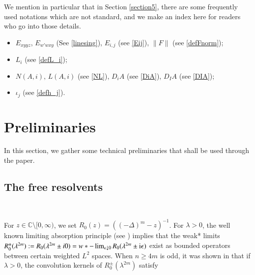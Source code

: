 \documentclass[11pt,reqno]{amsart}
\def\i{{\rm i}}
\numberwithin{equation}{section}
\theoremstyle{definition}
\begin{document}
We mention in particular that in Section \ref{section5}, there are some frequently used notations which are not standard, and we make an index here for readers who go into those details.
\begin{itemize}
	\item  $E_{xyyz}$, $E_{w'wxy}$ (See \eqref{linesing}),  $E_{i,j}$ (see \eqref{Eij}), $\|F\|$ (see \eqref{defFnorm});\vspace{10pt}
	
	\item  $L_i$ (see \eqref{defL_i});\vspace{10pt}
	
	\item $N(A,i),\,L(A,i)$ (see \eqref{NL}), $D_iA$ (see \eqref{DiA}), $D_IA$ (see \eqref{DIA});\vspace{10pt}
	
	\item $\iota_j$ (see \eqref{defh_j}).
	
	
	
\end{itemize}




\section{Preliminaries}\label{section2}
In this section, we gather some technical preliminaries that shall be used through the paper.

\subsection{The free resolvents}\label{section2.1}\

For $z\in \mathbb{C}\setminus[0,\infty)$, we set $R_0(z)=((-\Delta)^m-z)^{-1}$. For $\lambda>0$, the well known limiting absorption principle (see \cite{AH}) implies that the weak* limits $R_0^{\pm}(\lambda^{2m}):= R_0(\lambda^{2m}\pm i0)=w*-\lim_{\epsilon\downarrow0}R_0(\lambda^{2m}\pm\i\epsilon)$ exist as bounded operators between certain weighted $L^2$ spaces. When $n\geq 4m$ is odd, it was shown in \cite{CHHZ} that if $\lambda>0$, the convolution kernels of $R_0^\pm(\lambda^{2m})$ satisfy
\end{document}
